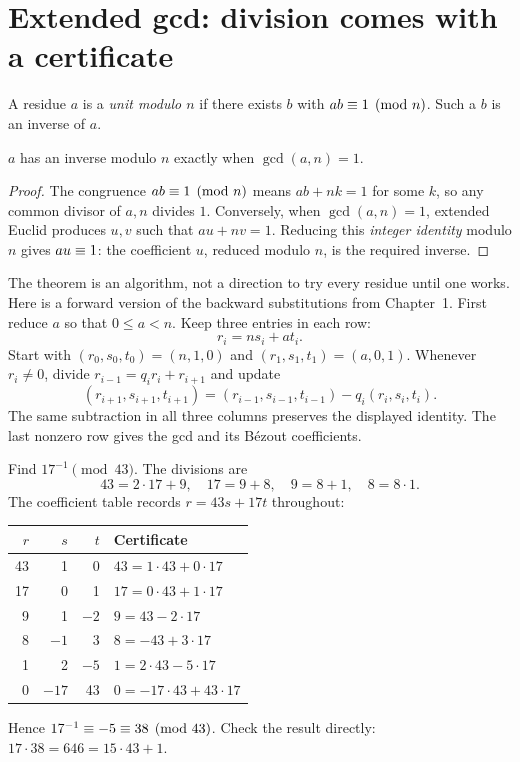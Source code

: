 \section{Extended gcd: division comes with a certificate}
\label{sec:modular-egcd}

\begin{definition}
A residue $a$ is a \emph{unit modulo $n$} if there exists $b$ with $ab\equiv1\pmod n$. Such a $b$ is an inverse of $a$.
\end{definition}

\begin{theorem}
$a$ has an inverse modulo $n$ exactly when $\gcd(a,n)=1$.
\end{theorem}

\begin{proof}
The congruence $ab\equiv1\pmod n$ means $ab+nk=1$ for some $k$, so any
common divisor of $a,n$ divides $1$. Conversely, when $\gcd(a,n)=1$,
extended Euclid produces $u,v$ such that $au+nv=1$. Reducing this
\emph{integer identity} modulo $n$ gives $au\equiv1$: the coefficient
$u$, reduced modulo $n$, is the required inverse.
\end{proof}

The theorem is an algorithm, not a direction to try every residue until
one works. Here is a forward version of the backward substitutions from
Chapter~1. First reduce $a$ so that $0\le a<n$. Keep three entries in each row:
\[
 r_i=ns_i+at_i.
\]
Start with $(r_0,s_0,t_0)=(n,1,0)$ and $(r_1,s_1,t_1)=(a,0,1)$.
Whenever $r_i\ne0$, divide $r_{i-1}=q_i r_i+r_{i+1}$ and update
\[
 (r_{i+1},s_{i+1},t_{i+1})
 =(r_{i-1},s_{i-1},t_{i-1})-q_i(r_i,s_i,t_i).
\]
The same subtraction in all three columns preserves the displayed
identity. The last nonzero row gives the gcd and its B\'ezout coefficients.

\begin{example}
Find $17^{-1}\pmod{43}$. The divisions are
\[
43=2\cdot17+9,\quad17=9+8,\quad9=8+1,\quad8=8\cdot1.
\]
The coefficient table records $r=43s+17t$ throughout:
\begin{center}
\begin{tabular}{rrrl}
\toprule
$r$ & $s$ & $t$ & Certificate \\
\midrule
43 & 1 & 0 & $43=1\cdot43+0\cdot17$ \\
17 & 0 & 1 & $17=0\cdot43+1\cdot17$ \\
9 & 1 & $-2$ & $9=43-2\cdot17$ \\
8 & $-1$ & 3 & $8=-43+3\cdot17$ \\
1 & 2 & $-5$ & $1=2\cdot43-5\cdot17$ \\
0 & $-17$ & 43 & $0=-17\cdot43+43\cdot17$ \\
\bottomrule
\end{tabular}
\end{center}
Hence $17^{-1}\equiv-5\equiv38\pmod{43}$. Check the result directly:
$17\cdot38=646=15\cdot43+1$.
\end{example}


